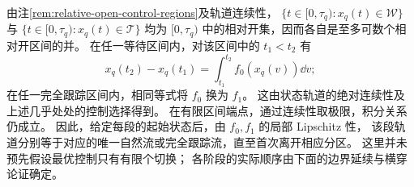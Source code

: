 由注\ref{rem:relative-open-control-regions}及轨道连续性，
$\{t\in[0,\tau_q):x_q(t)\in\mathcal W\}$ 与
$\{t\in[0,\tau_q):x_q(t)\in\mathcal T\}$
均为 $[0,\tau_q)$ 中的相对开集，因而各自是至多可数个相对开区间的并。
在任一等待区间内，对该区间中的 $t_1<t_2$ 有
\[
x_q(t_2)-x_q(t_1)=\int_{t_1}^{t_2}f_0(x_q(v))\dd v;
\]
在任一完全跟踪区间内，相同等式将 $f_0$ 换为 $f_1$。
这由状态轨道的绝对连续性及上述几乎处处的控制选择得到。
在有限区间端点，通过连续性取极限，积分关系仍成立。
因此，给定每段的起始状态后，由 $f_0,f_1$ 的局部 Lipschitz 性，
该段轨道分别等于对应的唯一自然流或完全跟踪流，直至首次离开相应分区。
这里并未预先假设最优控制只有有限个切换；
各阶段的实际顺序由下面的边界延续与横穿论证确定。
